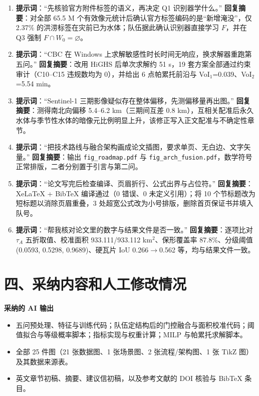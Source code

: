 \documentclass[11pt,a4paper]{ctexart}
\begin{document}
\begin{enumerate}[label=\arabic*.]
\item \textbf{提示词}：“先核验官方附件标签的语义，再决定 Q1 识别器学什么。”
\textbf{回复摘要}：对全部 65.5 M 个有效像元统计后确认官方标签编码的是“新增淹没”，仅 2.37\% 的洪涝标签在灾前已为水体；队伍据此确认识别器直接学习 $F$，并在 Q3 强制 $F\cap W_0=\varnothing$。

\item \textbf{提示词}：“CBC 在 Windows 上求解敏感性时长时间无响应，换求解器重跑第五问。”
\textbf{回复摘要}：改用 HiGHS 后单次求解约 51 s，19 套方案全部通过约束审计（C10--C15 违规数均为 0），并给出 6 点帕累托前沿与 VoI$_1$=0.039、VoI$_2$=5.54 min。

\item \textbf{提示词}：“Sentinel-1 三期影像疑似存在整体偏移，先测偏移量再出图。”
\textbf{回复摘要}：测得南北向偏移 5.4--6.2 km（三期间互差 0.8 km），互相关配准后永久水体与季节性水体的暗像元比例明显上升，该修正写入正文配准与不确定性章节。

\item \textbf{提示词}：“把技术路线与融合架构画成论文插图，要求单页、无白边、文字矢量。”
\textbf{回复摘要}：输出 \texttt{fig\_roadmap.pdf} 与 \texttt{fig\_arch\_fusion.pdf}，数学符号正常排版，二者分别置于引言与第二问。

\item \textbf{提示词}：“论文写完后检查编译、页眉折行、公式出界与占位符。”
\textbf{回复摘要}：XeLaTeX + BibTeX 编译通过（0 错误、0 未定义引用）；将 10 个节标题改为短标题以消除页眉重叠，3 处超宽公式改为小号排版，删除首页保证书并填入队号。

\item \textbf{提示词}：“帮我核对论文里的数字与结果文件是否一致。”
\textbf{回复摘要}：逐项比对 $\tau_A$ 五折取值、校准面积 933.111/933.112 km$^2$、保形覆盖率 87.8\%、分级阈值 (0.0593, 0.5298, 0.9689)、硬瓦片 IoU 0.266$\to$0.562 等，均与结果文件一致。
\end{enumerate}

\section*{四、采纳内容和人工修改情况}

\textbf{采纳的 AI 输出}
\begin{itemize}
\item 五问预处理、特征与训练代码；队伍定结构后的门控融合与面积校准代码；阈值拟合与等级概率脚本；指标实现与权重计算；MILP 与帕累托求解脚本。
\item 全部 25 件图（21 张数据图、1 张场景图、2 张流程/架构图、1 张 TikZ 图）及其数据来源表。
\item 英文章节初稿、摘要、建议信初稿，以及参考文献的 DOI 核验与 BibTeX 条目。
\end{itemize}
\end{document}
